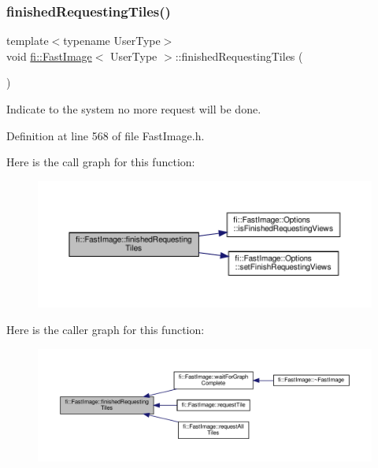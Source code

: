 \subsubsection{\texorpdfstring{finished\+Requesting\+Tiles()}{finishedRequestingTiles()}}
{\footnotesize\ttfamily template$<$typename User\+Type$>$ \\
void \hyperlink{classfi_1_1FastImage}{fi\+::\+Fast\+Image}$<$ User\+Type $>$\+::finished\+Requesting\+Tiles (\begin{DoxyParamCaption}{ }\end{DoxyParamCaption})\hspace{0.3cm}{\ttfamily [inline]}}



Indicate to the system no more request will be done. 



Definition at line 568 of file Fast\+Image.\+h.

Here is the call graph for this function\+:
\nopagebreak
\begin{figure}[H]
\begin{center}
\leavevmode
\includegraphics[width=350pt]{dc/d6b/classfi_1_1FastImage_af123b9f6554040faab14dcb0a06e2b84_cgraph}
\end{center}
\end{figure}
Here is the caller graph for this function\+:
\nopagebreak
\begin{figure}[H]
\begin{center}
\leavevmode
\includegraphics[width=350pt]{dc/d6b/classfi_1_1FastImage_af123b9f6554040faab14dcb0a06e2b84_icgraph}
\end{center}
\end{figure}
\mbox{\label{classfi_1_1FastImage_aa7c2a5653c878ef1d7f31360eaa85171}} 

